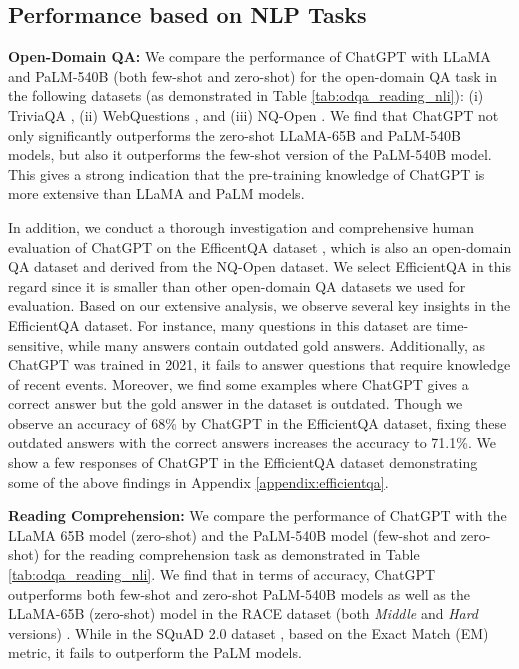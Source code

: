 \documentclass[11pt]{article}
\begin{document}
%
 
\subsection{Performance based on NLP Tasks}

\textbf{Open-Domain QA:} We compare the performance of ChatGPT with LLaMA \cite{touvron2023llama} and PaLM-540B (both few-shot and zero-shot) \cite{chowdhery2022palm} for the open-domain QA task in the following datasets (as demonstrated in Table \ref{tab:odqa_reading_nli}): (i) TriviaQA \cite{joshi2017triviaqa}, (ii) WebQuestions \cite{berant-etal-2013-semantic}, and (iii) NQ-Open \cite{kwiatkowski2019naturalquestions}. We find that ChatGPT not only significantly outperforms the zero-shot LLaMA-65B and PaLM-540B models, but also it outperforms the few-shot version of the PaLM-540B model. This gives a strong indication that the pre-training knowledge of ChatGPT is more extensive than LLaMA and PaLM models. 

In addition, we conduct a thorough investigation and comprehensive human evaluation of ChatGPT on the EfficentQA dataset \cite{min2021neuripsefficientqa}, which is also an open-domain QA dataset and derived from the NQ-Open dataset. We select EfficientQA in this regard since it is smaller than other open-domain QA datasets we used for evaluation. Based on our extensive analysis, we observe several key insights in the EfficientQA dataset. For instance, many questions in this dataset are time-sensitive, while many answers contain outdated gold answers. Additionally, as ChatGPT was trained in 2021, it fails to answer questions that require knowledge of recent events. Moreover, we find some examples where ChatGPT gives a correct answer but the gold answer in the dataset is outdated. Though we observe an accuracy of 68\% by ChatGPT in the EfficientQA dataset, fixing these outdated answers with the correct answers increases the accuracy to 71.1\%. We show a few responses of ChatGPT in the EfficientQA dataset demonstrating some of the above findings in Appendix \ref{appendix:efficientqa}.


\textbf{Reading Comprehension:} We compare the performance of ChatGPT with the LLaMA 65B model (zero-shot) and the PaLM-540B model (few-shot and zero-shot) for the reading comprehension task as demonstrated in Table \ref{tab:odqa_reading_nli}. We find that in terms of accuracy, ChatGPT outperforms both few-shot and zero-shot PaLM-540B models as well as the LLaMA-65B (zero-shot) model in the RACE
dataset (both \textit{Middle} and \textit{Hard} versions) \cite{lai2017race}. While in the SQuAD 2.0 dataset  \cite{rajpurkar2018know}, based on the Exact Match (EM) metric, it fails to outperform the PaLM models. 
\end{document}
